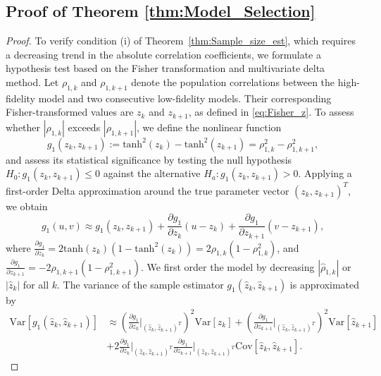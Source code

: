 \subsection{Proof of Theorem \ref{thm:Model_Selection}}
\begin{proof}
To verify condition (i) of Theorem~\ref{thm:Sample_size_est}, which requires a decreasing trend in the absolute correlation coefficients, we formulate a hypothesis test based on the Fisher transformation and multivariate delta method. Let $\rho_{1,k}$ and $\rho_{1,k+1}$ denote the population correlations between the high-fidelity model and two consecutive low-fidelity models. Their corresponding Fisher-transformed values are $z_k$ and $z_{k+1}$, as defined in \eqref{eq:Fisher_z}. To assess whether $|\rho_{1,k}|$ exceeds $|\rho_{1,k+1}|$, we define the nonlinear function
%
\[
g_1(z_k,z_{k+1}):=\text{tanh}^2(z_k)-\text{tanh}^2(z_{k+1})=\rho_{1,k}^2-\rho_{1,k+1}^2,
\]
%
and assess its statistical significance by testing the null hypothesis $H_0: g_1(z_k,z_{k+1}) \le 0$ against the alternative $H_a: g_1(z_k,z_{k+1}) > 0$. 
Applying a first-order Delta approximation around the true parameter vector  $(z_k,z_{k+1})^T$, we obtain
%
\[
g_1(u,v)\approx g_1(z_k,z_{k+1})+ \frac{\partial g_1}{\partial z_k} (u- z_k)+\frac{\partial  g_1}{\partial z_{k+1}}(v-z_{k+1}),
\]
%
where $\frac{\partial g_1}{\partial z_k} = 2\text{tanh}(z_k)(1-\text{tanh}^2(z_k)) = 2\rho_{1,k}(1-\rho_{1,k}^2)$, and $\frac{\partial g_1}{\partial z_{k+1}} = -2\rho_{1,k+1}(1-\rho_{1,k+1}^2)$. We first order the model by decreasing $|\widehat \rho_{1,k}|$ or $|\widehat z_k|$ for all $k$.  The variance of the sample estimator $g_1(\widehat z_k, \widehat z_{k+1})$ is approximated by
%
\begin{align*}
    \text{Var}\left[g_1(\widehat z_k, \widehat z_{k+1})\right] &\approx \left(\frac{\partial g_1}{\partial z_k}\Bigg\vert_{(\widehat z_k, \widehat z_{k+1})^T}\right)^2 \text{Var}\left[\widehat z_k\right]+\left(\frac{\partial g_1}{\partial z_{k+1}}\Bigg\vert_{(\widehat z_k, \widehat z_{k+1})^T}\right)^2 \text{Var}\left[\widehat z_{k+1}\right]\\
    &+2 \frac{\partial g_1}{\partial z_k}\Bigg\vert_{(\widehat z_k, \widehat z_{k+1})^T} \frac{\partial g_1}{\partial  z_{k+1}}\Bigg\vert_{(\widehat z_k, \widehat z_{k+1})^T}\text{Cov}\left[\widehat z_{k}, \widehat z_{k+1}\right].
\end{align*}

\end{proof}

